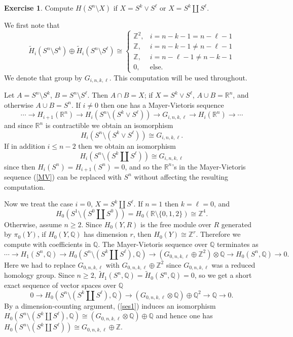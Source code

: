 \documentclass[10pt]{article}
\newcommand{\ZZ}{\mathbb{Z}}
\newcommand{\QQ}{\mathbb{Q}}
\newcommand{\RR}{\mathbb{R}}
\theoremstyle{definition}
\newtheorem{exer}{Exercise}
\begin{document}
\begin{exer}
Compute $H(S^n \setminus X)$ if $X = S^k \vee S^\ell$ or $X = S^k \amalg S^\ell$.
\end{exer}

We first note that
$$\tilde H_i(S^n \setminus S^k) \oplus \tilde H_i(S^n \setminus S^\ell) \cong \begin{cases}
\ZZ^2, &i = n - k - 1 = n - \ell - 1\\
\ZZ, &i = n - k - 1 \neq n - \ell - 1\\
\ZZ, &i = n - \ell - 1 \neq n - k - 1\\
0, &\text{else}.
\end{cases}$$
We denote that group by $G_{i,n,k,\ell}$.
This computation will be used throughout.

Let $A = S^n \setminus S^k$, $B = S^n \setminus S^\ell$. Then $A \cap B = X$; if $X = S^k \vee S^\ell$, $A \cup B = \RR^n$, and otherwise $A \cup B = S^n$.
If $i \neq 0$ then one has a Mayer-Vietoris sequence
\begin{equation}
\label{MV}
\cdots \to H_{i+1}(\RR^n) \to H_i(S^n \setminus (S^k \vee S^\ell)) \to G_{i,n,k,\ell} \to H_i(\RR^n) \to \cdots
\end{equation}
and since $\RR^n$ is contractible we obtain an isomorphism
$$H_i(S^n \setminus (S^k \vee S^\ell)) \cong G_{i,n,k,\ell}.$$
If in addition $i \leq n - 2$ then we obtain an isomorphism
$$H_i(S^n \setminus (S^k \amalg S^\ell)) \cong G_{i,n,k,\ell}$$
since then $H_i(S^n) = H_{i+1}(S^n) = 0$, and so the $\RR^n$'s in the Mayer-Vietoris sequence (\ref{MV}) can be replaced with $S^n$ without affecting the resulting computation.

Now we treat the case $i = 0$, $X = S^k \amalg S^\ell$.
If $n = 1$ then $k = \ell = 0$, and
$$H_0(S^1 \setminus (S^0 \amalg S^0)) = H_0(\RR \setminus \{0, 1, 2\}) \cong \ZZ^4.$$
Otherwise, assume $n \geq 2$.
Since $H_0(Y, R)$ is the free module over $R$ generated by $\pi_0(Y)$, if $H_0(Y, \QQ)$ has dimension $r$, then $H_0(Y) \cong \ZZ^r$.
Therefore we compute with coefficients in $\QQ$.
The Mayer-Vietoris sequence over $\QQ$ terminates as
$$\cdots \to H_1(S^n, \QQ) \to H_0(S^n \setminus (S^k \amalg S^\ell), \QQ) \to (G_{0,n,k,\ell} \oplus \ZZ^2) \otimes \QQ \to H_0(S^n, \QQ) \to 0.$$
Here we had to replace $G_{0, n, k, \ell}$ with $G_{0,n,k,\ell} \oplus \ZZ^2$ since $G_{0, n, k, \ell}$ was a reduced homology group.
Since $n \geq 2$, $\tilde H_1(S^n, \QQ) = \tilde H_0(S^n, \QQ) = 0$, so we get a short exact sequence of vector spaces over $\QQ$
\begin{equation}
\label{ses1}
0 \to H_0(S^n \setminus (S^k \amalg S^\ell), \QQ) \to (G_{0,n,k,\ell} \otimes \QQ) \oplus \QQ^2 \to \QQ \to 0.
\end{equation}
By a dimension-counting argument, (\ref{ses1}) induces an isomorphism $H_0(S^n \setminus (S^k \amalg S^\ell), \QQ) \cong (G_{0,n,k,\ell} \otimes \QQ) \oplus \QQ$ and hence one has $H_0(S^n \setminus (S^k \amalg S^\ell)) \cong G_{0,n,k,\ell} \oplus \ZZ$.
\end{document}
